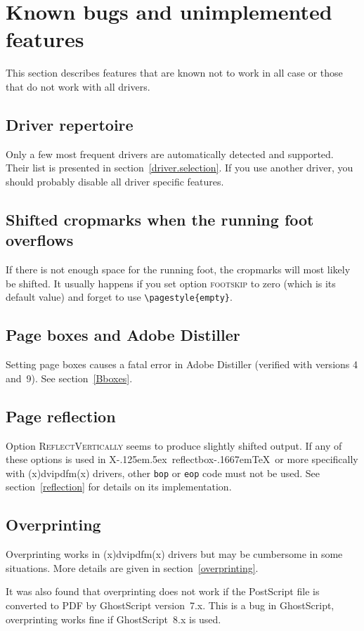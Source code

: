 \documentclass[11pt]{article}
\def\opt#1{\texorpdfstring{\textmd{\textsc{#1}}}{#1}}
\DeclareRobustCommand\XeTeX{X\kern-.125em\lower.5ex\hbox{\csname
              reflectbox\endcsname{E}}\kern-.1667em\TeX}
\begin{document}
\section{Known bugs and unimplemented features}
This section describes features that are known not to work in all case or those that do not work with
all drivers.

\subsection{Driver repertoire}
Only a few most frequent drivers are automatically detected and supported. Their list is presented
in section~\ref{driver.selection}. If you use another driver, you should probably disable all
driver specific features.

\subsection{Shifted cropmarks when the running foot overflows}
If there is not enough space for the running foot, the cropmarks will most likely be shifted. It
usually happens if you set option \opt{footskip} to zero (which is its default value) and forget to
use \verb.\pagestyle{empty}..

\subsection{Page boxes and Adobe Distiller}
Setting page boxes causes a fatal error in Adobe Distiller (verified with versions 4 and~9). See
section~\ref{Bboxes}.

\subsection{Page reflection}
Option \opt{ReflectVertically} seems to produce slightly shifted output. If any of these options is
used in \XeTeX\ or more specifically with (x)dvipdfm(x) drivers, other \texttt{bop} or \texttt{eop}
code must not be used. See section~\ref{reflection} for details on its implementation.

\subsection{Overprinting}
Overprinting works in (x)dvipdfm(x) drivers but may be cumbersome in some situations. More details
are given in section~\ref{overprinting}.

It was also found that overprinting does not work if the PostScript file is converted to PDF by
GhostScript version~7.x. This is a bug in GhostScript, overprinting works fine if
GhostScript~8.x is used.
\end{document}
